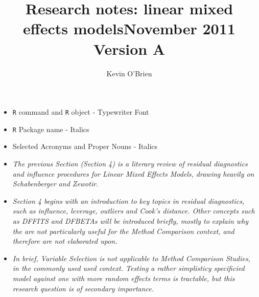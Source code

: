 \documentclass[12pt, a4paper]{report}
\title{Research notes: linear mixed effects models}
\author{ } \date{ }
\theoremstyle{plain}
\theoremstyle{definition}
\theoremstyle{remark}
\begin{document}
	\author{Kevin O'Brien}
	\title{November 2011 Version A}
	
	
	
	
	\tableofcontents \setcounter{tocdepth}{1}
	
\begin{framed} 
\begin{itemize}
	\item \texttt{R} command and \texttt{R} object - Typewriter Font
	\item \texttt{R} Package name - Italics
	\item Selected Acronyms and Proper Nouns - Italics
\end{itemize}
\end{framed}
\newpage


























\newpage
\begin{itemize}
\item \textit{
	The previous Section (Section 4) is a literary review of residual diagnostics and influence procedures
	for Linear Mixed Effects Models, drawing heavily on Schabenberger and Zewotir.}
	
\item \textit{	Section 4 begins with an introduction to key topics in residual diagnostics, such as influence, leverage, outliers
	and Cook's distance. Other concepts such as DFFITS and DFBETAs will be introduced briefly, mostly to explain why the are not particularly useful for
	the Method Comparison context, and therefore are not elaborated upon.}
	
\item \textit{	In brief, Variable Selection is not applicable to Method Comparison Studies, in the 
	commonly used used context. 
	Testing a rather simplisticy specificied model against one with more random effects terms is tractable, but this research question is of secondary importance.}
\end{itemize}
\end{document}
